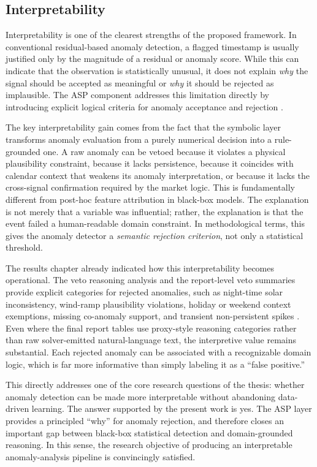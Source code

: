 \subsection{Interpretability}
\label{subsec:discussion_interpretability}

Interpretability is one of the clearest strengths of the proposed framework. In conventional residual-based anomaly detection, a flagged timestamp is usually justified only by the magnitude of a residual or anomaly score. While this can indicate that the observation is statistically unusual, it does not explain \emph{why} the signal should be accepted as meaningful or \emph{why} it should be rejected as implausible. The ASP component addresses this limitation directly by introducing explicit logical criteria for anomaly acceptance and rejection \cite{gelfond1988stable,gebser2012answer,gebser2019multi}.

The key interpretability gain comes from the fact that the symbolic layer transforms anomaly evaluation from a purely numerical decision into a rule-grounded one. A raw anomaly can be vetoed because it violates a physical plausibility constraint, because it lacks persistence, because it coincides with calendar context that weakens its anomaly interpretation, or because it lacks the cross-signal confirmation required by the market logic. This is fundamentally different from post-hoc feature attribution in black-box models. The explanation is not merely that a variable was influential; rather, the explanation is that the event failed a human-readable domain constraint. In methodological terms, this gives the anomaly detector a \emph{semantic rejection criterion}, not only a statistical threshold.

The results chapter already indicated how this interpretability becomes operational. The veto reasoning analysis and the report-level veto summaries provide explicit categories for rejected anomalies, such as night-time solar inconsistency, wind-ramp plausibility violations, holiday or weekend context exemptions, missing co-anomaly support, and transient non-persistent spikes \cite{repo_thesis_grid_anomaly}. Even where the final report tables use proxy-style reasoning categories rather than raw solver-emitted natural-language text, the interpretive value remains substantial. Each rejected anomaly can be associated with a recognizable domain logic, which is far more informative than simply labeling it as a ``false positive.''

This directly addresses one of the core research questions of the thesis: whether anomaly detection can be made more interpretable without abandoning data-driven learning. The answer supported by the present work is yes. The ASP layer provides a principled ``why'' for anomaly rejection, and therefore closes an important gap between black-box statistical detection and domain-grounded reasoning. In this sense, the research objective of producing an interpretable anomaly-analysis pipeline is convincingly satisfied.

